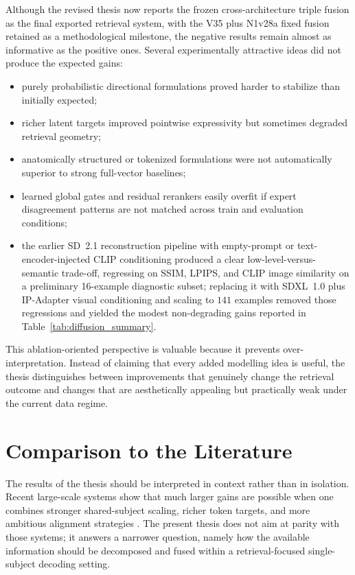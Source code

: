 Although the revised thesis now reports the frozen cross-architecture triple fusion as the final exported retrieval system, with the V35 plus N1v28a fixed fusion retained as a methodological milestone, the negative results remain almost as informative as the positive ones. Several experimentally attractive ideas did not produce the expected gains:
\begin{itemize}
    \item purely probabilistic directional formulations proved harder to stabilize than initially expected;
    \item richer latent targets improved pointwise expressivity but sometimes degraded retrieval geometry;
    \item anatomically structured or tokenized formulations were not automatically superior to strong full-vector baselines;
    \item learned global gates and residual rerankers easily overfit if expert disagreement patterns are not matched across train and evaluation conditions;
    \item the earlier SD~2.1 reconstruction pipeline with empty-prompt or text-encoder-injected CLIP conditioning produced a clear low-level-versus-semantic trade-off, regressing on SSIM, LPIPS, and CLIP image similarity on a preliminary 16-example diagnostic subset; replacing it with SDXL~1.0 plus IP-Adapter visual conditioning and scaling to $141$ examples removed those regressions and yielded the modest non-degrading gains reported in Table~\ref{tab:diffusion_summary}.
\end{itemize}

This ablation-oriented perspective is valuable because it prevents over-interpretation. Instead of claiming that every added modelling idea is useful, the thesis distinguishes between improvements that genuinely change the retrieval outcome and changes that are aesthetically appealing but practically weak under the current data regime.

\section{Comparison to the Literature}

The results of the thesis should be interpreted in context rather than in isolation. Recent large-scale systems show that much larger gains are possible when one combines stronger shared-subject scaling, richer token targets, and more ambitious alignment strategies \cite{Scotti2024}. The present thesis does not aim at parity with those systems; it answers a narrower question, namely how the available information should be decomposed and fused within a retrieval-focused single-subject decoding setting.

